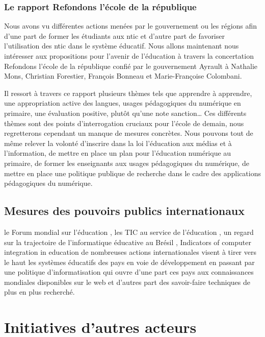 \subsection{Le rapport \og{}Refondons l'école de la république\fg{}}

Nous avons vu différentes actions menées par le gouvernement ou les régions afin d'une part de former les étudiants aux \gls{ntic} et d'autre part de favoriser l'utilisation des \gls{ntic} dans le système éducatif. Nous allons maintenant nous intéresser aux propositions pour l'avenir de l'éducation à travers la concertation \og{}Refondons l'école de la république\fg{} confié par le gouvernement Ayrault à Nathalie Mons, Christian Forestier, François Bonneau et Marie-Françoise Colombani. 

Il ressort à travers ce rapport plusieurs thèmes tels que \og{}apprendre à apprendre\fg{}, \og{}une appropriation active des langues\fg{}, \og{}usages pédagogiques du numérique en primaire\fg{}, \og{}une évaluation positive, plutôt qu'une note sanction\fg{}… Ces différents thèmes sont des points d'interrogation cruciaux pour l'école de demain, nous regretterons cependant un manque de mesures concrètes. Nous pouvons tout de même relever la volonté d'inscrire dans la loi \og l'éducation aux médias et à l'information\fg{}, de mettre en place un plan pour l'éducation numérique au primaire, de former les enseignants aux usages pédagogiques du numérique, de mettre en place une politique publique de recherche dans le cadre des applications pédagogiques du numérique.

\section{Mesures des pouvoirs publics internationaux}
le Forum mondial sur l’éducation \cite{educ_forum}, les TIC au service
de l’éducation \cite{tics}, un regard sur la trajectoire de
l’informatique éducative au Brésil \cite{peixoto2006regard},
\og{}Indicators of computer integration in education\fg{}
\cite{pelgrum1993indicators} de nombreuses actions internationales
visent à tirer vers le haut les systèmes éducatifs des pays en voie de
développement en passant par une politique d'informatisation qui ouvre
d'une part ces pays aux connaissances mondiales disponibles sur le web
et d'autres part des savoir-faire techniques de plus en plus
recherché. 


\chapter{Initiatives d'autres acteurs}
\label{chap:initialivesautres}

